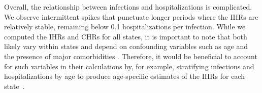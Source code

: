 Overall, the relationship between infections and hospitalizations is
complicated. We observe intermittent spikes that punctuate longer periods where
the IHRs are relatively stable, remaining below 0.1 hospitalizations per
infection. While we computed the IHRs and CHRs for all states, it is important
to note that both likely vary within states and depend on confounding variables
such as age and the presence of major comorbidities
\citep{russell2023comorbidities}. Therefore, it would be beneficial to account
for such variables in their calculations by, for example, stratifying infections
and hospitalizations by age to produce age-specific estimates of the IHRs for
each state~\citep{fox2023disproportionate}.





